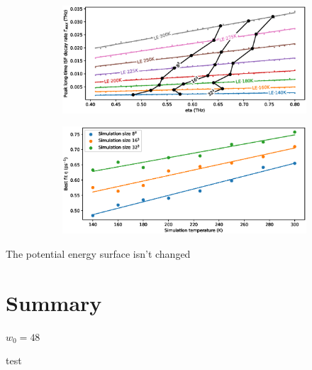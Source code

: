 \documentclass{article}
\begin{document}
\begin{figure}
	\begin{subfigure}{1.0\textwidth}
		\centering
		\includegraphics[width=1.0\textwidth]{md_vs_gle_gamma}
		\caption{}
		\label{fig:md_vs_gle_gamma}
	\end{subfigure}
	
	\begin{subfigure}{1.0\textwidth}
		\centering
		\includegraphics[width=1.0\textwidth]{md_temp_vs_eta}
		\caption{}
		\label{fig:md_temp_vs_eta}
	\end{subfigure}
\end{figure}

The potential energy surface isn't changed

\section{Summary}

$w_0=48$

test
\end{document}
